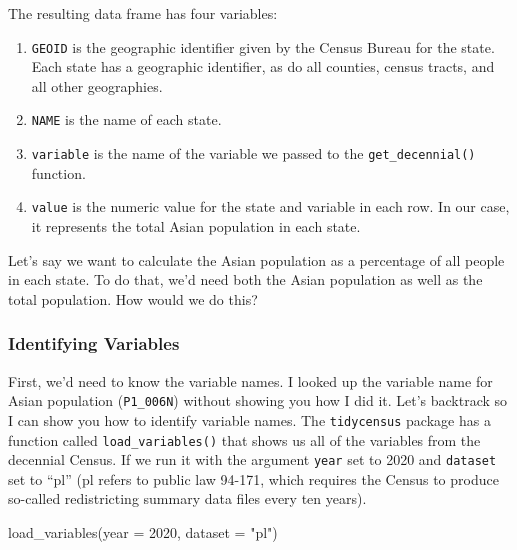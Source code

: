 \documentclass[
]{book}
\newenvironment{Shaded}{\begin{snugshade}}{\end{snugshade}}
\newcommand{\AttributeTok}[1]{\textcolor[rgb]{0.77,0.63,0.00}{#1}}
\newcommand{\DecValTok}[1]{\textcolor[rgb]{0.00,0.00,0.81}{#1}}
\newcommand{\FunctionTok}[1]{\textcolor[rgb]{0.00,0.00,0.00}{#1}}
\newcommand{\NormalTok}[1]{#1}
\newcommand{\StringTok}[1]{\textcolor[rgb]{0.31,0.60,0.02}{#1}}
\providecommand{\tightlist}{%
  \setlength{\itemsep}{0pt}\setlength{\parskip}{0pt}}
\begin{document}
The resulting data frame has four variables:

\begin{enumerate}
\def\labelenumi{\arabic{enumi}.}
\tightlist
\item
  \texttt{GEOID} is the geographic identifier given by the Census Bureau for the state. Each state has a geographic identifier, as do all counties, census tracts, and all other geographies.
\item
  \texttt{NAME} is the name of each state.
\item
  \texttt{variable} is the name of the variable we passed to the \texttt{get\_decennial()} function.
\item
  \texttt{value} is the numeric value for the state and variable in each row. In our case, it represents the total Asian population in each state.
\end{enumerate}

Let's say we want to calculate the Asian population as a percentage of all people in each state. To do that, we'd need both the Asian population as well as the total population. How would we do this?

\hypertarget{identifying-variables}{%
\subsubsection*{Identifying Variables}\label{identifying-variables}}

First, we'd need to know the variable names. I looked up the variable name for Asian population (\texttt{P1\_006N}) without showing you how I did it. Let's backtrack so I can show you how to identify variable names. The \texttt{tidycensus} package has a function called \texttt{load\_variables()} that shows us all of the variables from the decennial Census. If we run it with the argument \texttt{year} set to 2020 and \texttt{dataset} set to ``pl'' (pl refers to public law 94-171, which requires the Census to produce so-called redistricting summary data files every ten years).

\begin{Shaded}
\begin{Highlighting}[]
\FunctionTok{load\_variables}\NormalTok{(}\AttributeTok{year =} \DecValTok{2020}\NormalTok{, }
               \AttributeTok{dataset =} \StringTok{"pl"}\NormalTok{)}
\end{Highlighting}
\end{Shaded}
\end{document}
